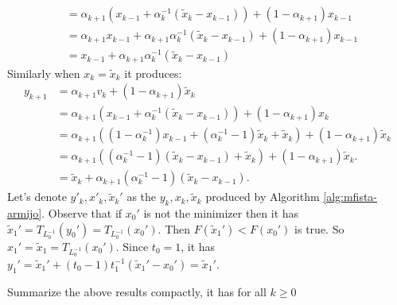 \documentclass[12pt]{report}
\begin{document}
\begin{example}
\begin{align*}
                \\
                &= \alpha_{k + 1}(x_{k - 1} + \alpha_k^{-1}(\tilde x_k - x_{k - 1})) + (1 - \alpha_{k + 1})x_{k - 1}
                \\
                &= \alpha_{k + 1} x_{k - 1} + \alpha_{k + 1}\alpha_k^{-1}(\tilde x_k - x_{k - 1}) + (1 - \alpha_{k + 1}) x_{k - 1}
                \\
                &= x_{k - 1} + \alpha_{k + 1}\alpha_k^{-1}(\tilde x_k - x_{k - 1})
            \end{align*}
            Similarly when $x_k = \tilde x_k$ it produces: 
            \begin{align*}
                y_{k + 1} &= 
                \alpha_{k + 1}v_k + (1 - \alpha_{k + 1})\tilde x_k
                \\
                &= 
                \alpha_{k + 1}(x_{k - 1} + \alpha_k^{-1}(\tilde x_k - x_{k - 1})) + (1 - \alpha_{k + 1})x_k
                \\
                &= 
                \alpha_{k + 1}\left(
                    (1 - \alpha_{k}^{-1})x_{k - 1} + (\alpha_k^{-1} - 1)\tilde x_k + \tilde x_k
                \right) + 
                (1 - \alpha_{k + 1})\tilde x_k
                \\
                &= 
                \alpha_{k + 1}\left(
                    (\alpha_k^{-1} - 1)(\tilde x_k - x_{k - 1}) + \tilde x_k
                \right) + 
                (1 - \alpha_{k + 1})\tilde x_k. 
                \\
                &= \tilde x_k + \alpha_{k + 1}(\alpha_k^{-1} - 1)(\tilde x_k - x_{k - 1}). 
            \end{align*}
            Let's denote $y'_{k}, x'_{k}, \tilde x_k'$ as the $y_k, x_k, \tilde x_k$ produced by Algorithm \ref{alg:mfista-armijo}.
            Observe that if $x_0'$ is not the minimizer then it has $\tilde x_1' = T_{L_0^{-1}}(y_0') = T_{L_0^{-1}}(x_0')$. 
            Then $F(\tilde x_1') < F(x_0')$ is true. 
            So $x_1' = \tilde x_1 = T_{L_0^{-1}}(x_0')$. 
            Since $t_0 = 1$, it has $y_1' =\tilde x_1' + (t_0 - 1)t_1^{-1}(\tilde x_1' - x_0')= \tilde x_1'$. 
            \par
            Summarize the above results compactly, it has for all $k \ge 0$
            \begin{align}\label{eqn:emp:result-item-1}

\end{align}
\end{example}
\end{document}
